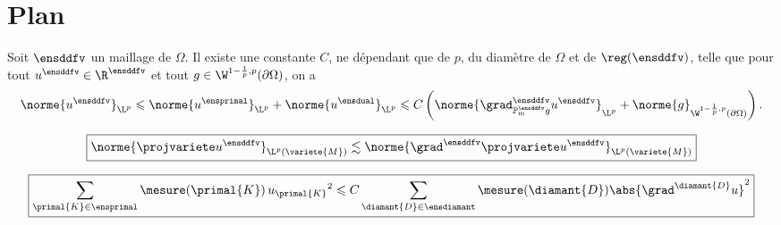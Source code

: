 \section{Plan}

\begin{theo}[Objectif]
    Soit $\ensddfv$ un maillage de $\Omega$. Il existe une constante $C$, ne dépendant que de $p$, du diamètre de $\Omega$ et de $\reg(\ensddfv)$, telle que pour tout $u^\ensddfv \in \R^\ensddfv$ et tout $g \in \W^{1-\frac{1}{p},p}(\partial \Omega)$, on a
    \[
    \norme{u^\ensddfv}_{\L^p} \leqslant 
    \norme{u^\ensprimal}_{\L^p} + \norme{u^\ensdual}_{\L^p} \leqslant
    C \left( \norme{\grad_{\mathbb{P}^\ensddfv_\mathrm{m} g}^\ensddfv u^\ensddfv}_{\L^p} + \norme{g}_{\W^{1-\frac{1}{p},p}(\partial \Omega)} \right).
    \]
\end{theo}

\[
\boxed{
\norme{\projvariete u^\ensddfv}_{\L^p(\variete{M})} \lesssim \norme{\grad^\ensddfv \projvariete u^\ensddfv}_{\L^p(\variete{M})}
}
\]

\[
\boxed{
\sum_{\primal{K} \in \ensprimal} \mesure(\primal{K}) \, u_{\primal{K}}{}^2 \leqslant C \sum_{\diamant{D} \in \ensdiamant} \mesure(\diamant{D}) \abs{\grad^{\diamant{D}} u}^2
}
\]

